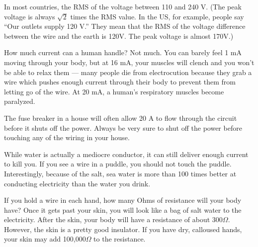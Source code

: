 In most countries, the RMS of the voltage between 110 and 240 V. (The
peak voltage is always $\sqrt{2}$ times the RMS value. In the US, for
example, people say ``Our outlets supply 120 V.'' They mean that the
RMS of the voltage difference between the wire and the earth is 120V.
The peak voltage is almost 170V.)

How much current can a human handle? Not much. You can barely feel 1
mA moving through your body, but at 16 mA, your muscles will clench
and you won't be able to relax them --- many people die from
electrocution because they grab a wire which pushes enough current
through their body to prevent them from letting go of the wire. At 20
mA, a human's respiratory muscles become paralyzed.

The fuse breaker in a house will often allow 20 A to flow through the
circuit before it shuts off the power. Always be very sure to shut off
the power before touching any of the wiring in your house.

While water is actually a mediocre conductor, it can still deliver enough current
to kill you. If you see a wire in a puddle, you should not touch the
puddle. Interestingly, because of the salt, sea water is more than
100 times better at conducting electricity than the water you drink.


If you hold a wire in each hand, how many Ohms of resistance will your
body have? Once it gets past your skin, you will look like a bag of
salt water to the electricity. After the skin, your body will have a
resistance of about 300$\Omega$. However, the skin is a pretty good
insulator. If you have dry, calloused hands, your skin may add
100,000$\Omega$ to the resistance.


